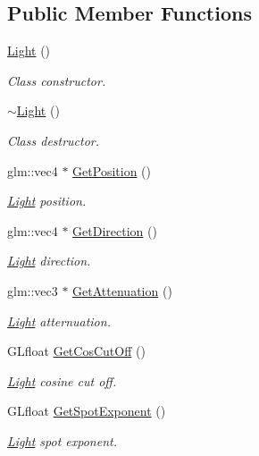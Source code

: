 \subsection*{Public Member Functions}
\begin{DoxyCompactItemize}
\item 
\hyperlink{class_light_aeb5df09a25a32f19fdffa761268ba24f}{Light} ()
\begin{DoxyCompactList}\small\item\em Class constructor. \end{DoxyCompactList}\item 
\hyperlink{class_light_ad0e59fad13bb6cfadc25b2c477e9ddc7}{$\sim$\+Light} ()
\begin{DoxyCompactList}\small\item\em Class destructor. \end{DoxyCompactList}\item 
glm\+::vec4 $\ast$ \hyperlink{class_light_a5ae42d0f1ff71f86b52ede3a37da455d}{Get\+Position} ()
\begin{DoxyCompactList}\small\item\em \hyperlink{class_light}{Light} position. \end{DoxyCompactList}\item 
glm\+::vec4 $\ast$ \hyperlink{class_light_a5373bb221bc648c203236d52b787416a}{Get\+Direction} ()
\begin{DoxyCompactList}\small\item\em \hyperlink{class_light}{Light} direction. \end{DoxyCompactList}\item 
glm\+::vec3 $\ast$ \hyperlink{class_light_ac017022a6e8dd3a29de1e024cfde9d9b}{Get\+Attenuation} ()
\begin{DoxyCompactList}\small\item\em \hyperlink{class_light}{Light} atternuation. \end{DoxyCompactList}\item 
G\+Lfloat \hyperlink{class_light_ad1ddee3ac2e66ee13e41544603587393}{Get\+Cos\+Cut\+Off} ()
\begin{DoxyCompactList}\small\item\em \hyperlink{class_light}{Light} cosine cut off. \end{DoxyCompactList}\item 
G\+Lfloat \hyperlink{class_light_ad40e4b5500b2b8d9be2ec76dc99e8868}{Get\+Spot\+Exponent} ()
\begin{DoxyCompactList}\small\item\em \hyperlink{class_light}{Light} spot exponent. \end{DoxyCompactList}\end{DoxyCompactItemize}
